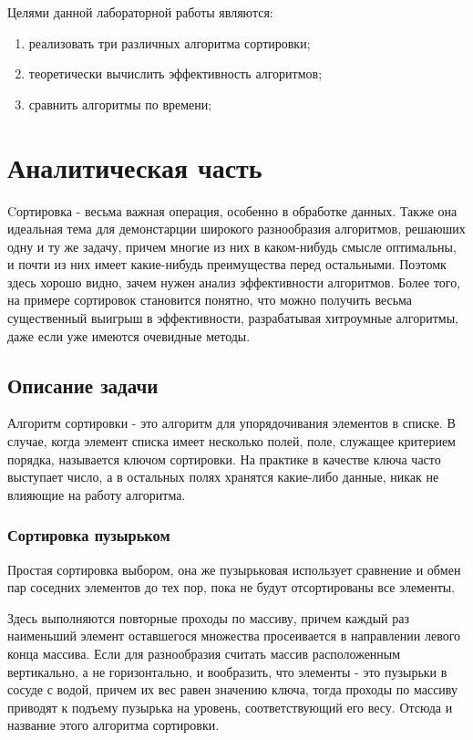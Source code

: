 \documentclass[a4paper]{article}
\begin{document}
	
	Целями данной лабораторной работы являются:
	\begin{enumerate}
		\item реализовать три различных алгоритма сортировки;
		\item теоретически вычислить эффективность алгоритмов;
		\item сравнить алгоритмы по времени;
	\end{enumerate}
	\clearpage
	
	\section{Аналитическая часть}
	Cортировка - весьма важная операция, особенно в обработке данных. Также она идеальная тема для демонстарции широкого разнообразия алгоритмов, решаюших одну и ту же задачу, причем многие из них в каком-нибудь смысле оптимальны, и почти из них имеет какие-нибудь преимущества перед остальными. Поэтомк здесь хорошо видно, зачем нужен анализ эффективности алгоритмов. Более того, на примере сортировок становится понятно, что можно получить весьма существенный выигрыш в эффективности, разрабатывая хитроумные алгоритмы, даже если уже имеются очевидные методы.
	
	\subsection{Описание задачи}
	Алгоритм сортировки - это алгоритм для упорядочивания элементов в списке. В случае, когда элемент списка имеет несколько полей, поле, служащее критерием порядка, называется ключом сортировки. На практике в качестве ключа часто выступает число, а в остальных полях хранятся какие-либо данные, никак не влияющие на работу алгоритма.
	
	\subsubsection{Сортировка пузырьком}
	Простая сортировка выбором, она же пузырьковая использует сравнение и обмен пар соседних элементов до тех пор, пока не будут отсортированы все элементы.
	
	Здесь выполняются повторные проходы по массиву, причем каждый раз наименьший элемент оставшегося множества просеивается в направлении левого конца массива. Если для разнообразия считать массив расположенным вертикально, а не горизонтально, и вообразить, что элементы - это пузырьки в сосуде с водой, причем их вес равен значению ключа, тогда проходы по массиву приводят к подъему пузырька на уровень, соответствующий его весу. Отсюда и название этого алгоритма сортировки.
	
\end{document}
